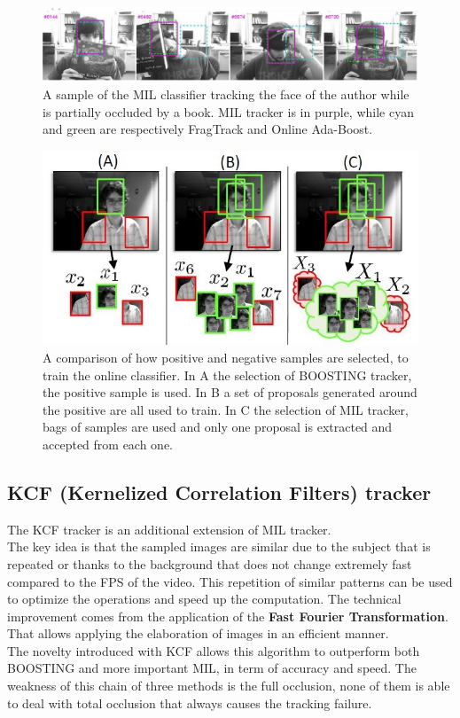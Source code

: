 \begin{figure}[!h]
	\centering
	\includegraphics[width=1\linewidth]{images/tracking/sample_MIL}
	\caption{A sample of the MIL classifier tracking the face of the author while is partially occluded by a book. MIL tracker is in purple, while cyan and green are respectively FragTrack\cite{fragTrack} and Online Ada-Boost\cite{onlineAdaBoostTracker}.}
	\label{fig:sample_MIL}
\end{figure}
\begin{figure}[!h]
	\centering
	\includegraphics[width=0.8\linewidth]{images/tracking/howItWorks_MIL}
	\caption{A comparison of how positive and negative samples are selected, to train the online classifier. In A the selection of BOOSTING tracker, the positive sample is used. In B a set of proposals generated around the positive are all used to train. In C the selection of MIL tracker, bags of samples are used and only one proposal is extracted and accepted from each one.}
	\label{fig:howItWorks_MIL}
\end{figure}


\subsection{KCF (Kernelized Correlation Filters) tracker} \label{sec:kcf}
The KCF tracker\cite{kcf}\cite{kcf-withColor} is an additional extension of MIL tracker.\\
The key idea is that the sampled images are similar due to the subject that is repeated or thanks to the background that does not change extremely fast compared to the FPS of the video. This repetition of similar patterns can be used to optimize the operations and speed up the computation. The technical improvement comes from the application of the \textbf{Fast Fourier Transformation}. That allows applying the elaboration of images in an efficient manner.\\
The novelty introduced with KCF allows this algorithm to outperform both BOOSTING and more important MIL, in term of accuracy and speed. The weakness of this chain of three methods is the full occlusion, none of them is able to deal with total occlusion that always causes the tracking failure.


